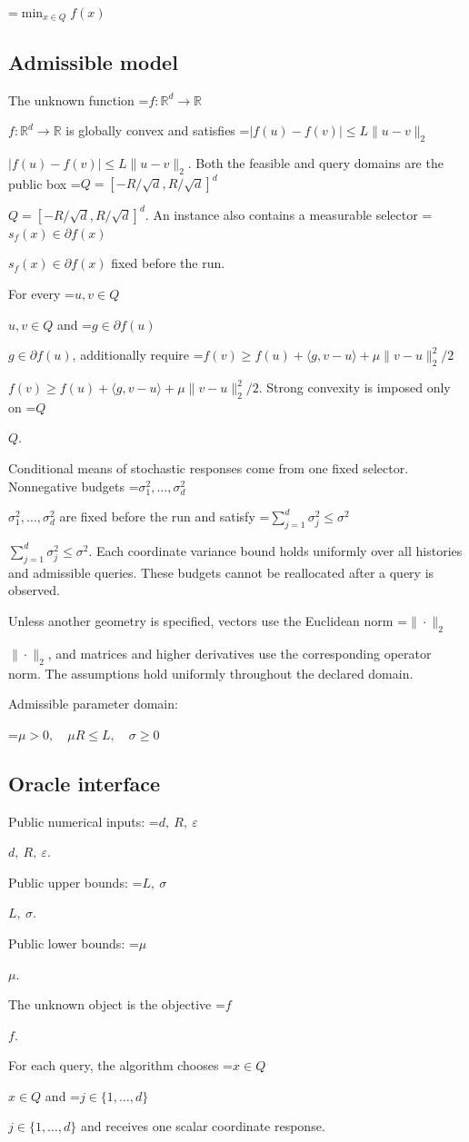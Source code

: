 \documentclass[10pt,a4paper]{article}
\newcommand{\AtlasMath}[1]{\par\begingroup\centering\setbox0=\hbox{$\displaystyle #1$}\ifdim\wd0>1.4\linewidth\typeout{ATLAS WIDE FORMULA: \the\wd0}\fi\ifdim\wd0>\linewidth\resizebox{\linewidth}{!}{\box0}\else\box0\fi\par\endgroup}
\newcommand{\AtlasInlineMath}[1]{\begingroup\setbox0=\hbox{$#1$}\ifdim\wd0>.4\linewidth\endgroup\AtlasMath{#1}\else\endgroup$#1$\fi}
\begin{document}
\AtlasMath{\min_{x\in Q}f(x)}


\subsection{Admissible model}
The unknown function \AtlasInlineMath{f:\mathbb R^d\to\mathbb R} is globally convex and satisfies \AtlasInlineMath{|f(u)-f(v)|\le L\|u-v\|_2}. Both the feasible and query domains are the public box \AtlasInlineMath{Q=[-R/\sqrt d,R/\sqrt d]^d}. An instance also contains a measurable selector \AtlasInlineMath{s_f(x)\in\partial f(x)} fixed before the run.

For every \AtlasInlineMath{u,v\in Q} and \AtlasInlineMath{g\in\partial f(u)}, additionally require \AtlasInlineMath{f(v)\ge f(u)+\langle g,v-u\rangle+\mu\|v-u\|_2^2/2}. Strong convexity is imposed only on \AtlasInlineMath{Q}.

Conditional means of stochastic responses come from one fixed selector. Nonnegative budgets \AtlasInlineMath{\sigma_1^2,\ldots,\sigma_d^2} are fixed before the run and satisfy \AtlasInlineMath{\sum_{j=1}^d\sigma_j^2\le\sigma^2}. Each coordinate variance bound holds uniformly over all histories and admissible queries. These budgets cannot be reallocated after a query is observed.

Unless another geometry is specified, vectors use the Euclidean norm \AtlasInlineMath{\|\cdot\|_2}, and matrices and higher derivatives use the corresponding operator norm. The assumptions hold uniformly throughout the declared domain.

Admissible parameter domain:


\AtlasMath{\mu>0,\quad\mu R\le L,\quad\sigma\ge0}


\subsection{Oracle interface}
Public numerical inputs: \AtlasInlineMath{d,\ R,\ \varepsilon}.

Public upper bounds: \AtlasInlineMath{L,\ \sigma}.

Public lower bounds: \AtlasInlineMath{\mu}.

The unknown object is the objective \AtlasInlineMath{f}.

For each query, the algorithm chooses \AtlasInlineMath{x\in Q} and \AtlasInlineMath{j\in\{1,\ldots,d\}} and receives one scalar coordinate response.
\end{document}
